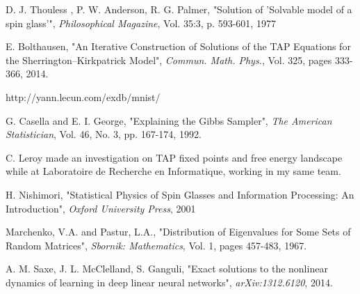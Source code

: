 \begin{thebibliography}{9}
D. J. Thouless , P. W. Anderson, R. G. Palmer,
"Solution of 'Solvable model of a spin glass'",
\textit{Philosophical Magazine}, Vol. 35:3, p. 593-601, 1977

E. Bolthausen, "An Iterative Construction of Solutions of the TAP Equations for the Sherrington–Kirkpatrick Model", \textit{Commun. Math. Phys.}, Vol. 325, pages 333-366, 2014.

http://yann.lecun.com/exdb/mnist/

G. Casella and E. I. George, "Explaining the Gibbs Sampler",
\textit{The American Statistician},
Vol. 46, No. 3, pp. 167-174, 1992.

C. Leroy made an investigation on TAP fixed points and free energy landscape while at Laboratoire de Recherche en Informatique, working in my same team.

H. Nishimori, "Statistical Physics of Spin Glasses and Information Processing: An Introduction",
\textit{Oxford University Press}, 2001

Marchenko, V.A. and Pastur, L.A., "Distribution of Eigenvalues for Some Sets of Random Matrices", \textit{Sbornik: Mathematics}, Vol. 1, pages 457-483, 1967.

A. M. Saxe, J. L. McClelland, S. Ganguli, "Exact solutions to the nonlinear dynamics of learning in deep linear neural networks",
\textit{arXiv:1312.6120}, 2014.

\end{thebibliography}

